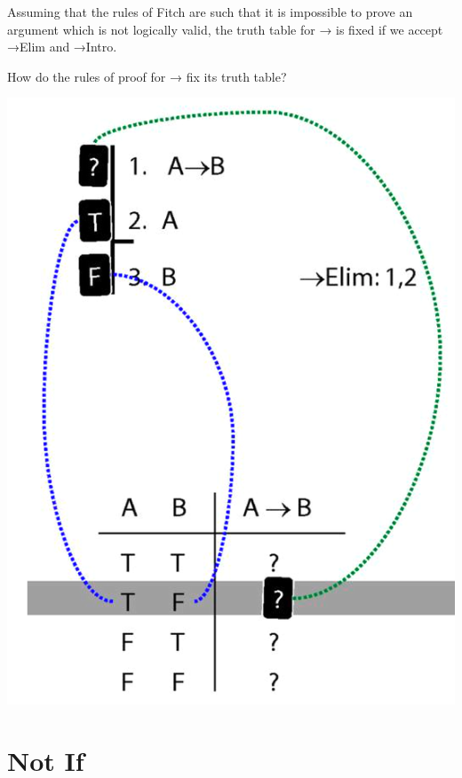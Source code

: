 \documentclass[12pt]{extarticle}
\begin{document}
\begin{multicols*}{3}
Assuming that the rules of Fitch are such that it is impossible to prove an argument which is not logically valid, the truth table for → is fixed if we accept →Elim and →Intro.
 
How do the rules of proof for → fix its truth table?
 
\begin{center}
\includegraphics[scale=0.3]{img/unit_700_rule_to_tt.png}
\end{center}
 
 
\section{Not If}
 

\end{multicols*}
\end{document}

